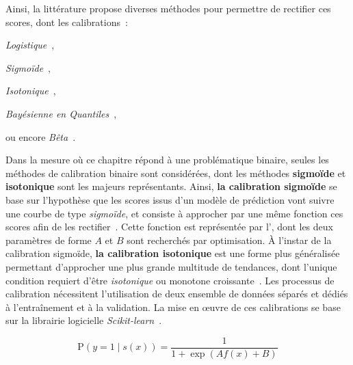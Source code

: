 Ainsi, la littérature propose diverses méthodes pour permettre de rectifier ces scores, dont les calibrations~:
\begin{inlinerate}
    \item \textit{Logistique}~\cite{Friedman2000},
    \item \textit{Sigmoïde}~\cite{Platt2000,kull2017b},
    \item \textit{Isotonique}~\cite{Zadrozny2002},
    \item \textit{Bayésienne en Quantiles}~\cite{Naeini2015},
    \item ou encore \textit{Bêta}~\cite{Kull2017}.
\end{inlinerate} Dans la mesure où ce chapitre répond à une problématique binaire, seules les méthodes de calibration binaire sont considérées, dont les méthodes \textbf{sigmoïde} et \textbf{isotonique} sont les majeurs représentants. Ainsi, \textbf{la calibration sigmoïde} se base sur l'hypothèse que les scores issus d'un modèle de prédiction vont suivre une courbe de type \textit{sigmoïde}, et consiste à approcher par une même fonction ces scores afin de les rectifier~\cite{NiculescuMizil2005}. Cette fonction est représentée par l', dont les deux paramètres de forme $A$ et $B$ sont recherchés par optimisation. À l'instar de la calibration sigmoïde, \textbf{la calibration isotonique} est une forme plus généralisée permettant d'approcher une plus grande multitude de tendances, dont l'unique condition requiert d'être \textit{isotonique} ou monotone croissante~\cite{NiculescuMizil2005}. Les processus de calibration nécessitent l'utilisation de deux ensemble de données séparés et dédiés à l'entraînement et à la validation. La mise en œuvre de ces calibrations se base sur la librairie logicielle \textit{Scikit-learn}~\cite{pedregosa2011}.\par

\begin{equation}
    \mathrm{P}(y=1 \mid s(x))=\frac{1}{1+\exp (A f(x)+B)}
    \label{eq:sigmoid_calibration}
\end{equation}

\clearpage

